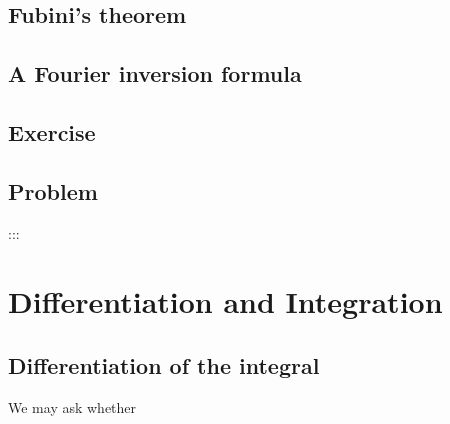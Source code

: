 \documentclass[
]{book}
\theoremstyle{definition}
\theoremstyle{definition}
\theoremstyle{definition}
\theoremstyle{definition}
\theoremstyle{remark}
\begin{document}
\section{Fubini's theorem}\label{fubinis-theorem}

\section{A Fourier inversion formula}\label{a-fourier-inversion-formula}

\section{Exercise}\label{exercise-1}

\section{Problem}\label{problem-1}

:::

\chapter{Differentiation and Integration}\label{ch3}

\section{Differentiation of the integral}\label{differentiation-of-the-integral}

We may ask whether

  
\end{document}
